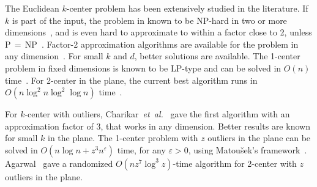 \documentclass[envcountsame]{cls/cccg15}
\renewcommand{\O}{\ensuremath{{O}}}
\newcommand{\eps}{\varepsilon}
\newcommand{\etal}{{\em et~al.\/}}
\begin{document}

The Euclidean $k$-center problem has been extensively studied in the literature.
If $k$ is part of the input,
the problem in known to be NP-hard in two or more dimensions~\cite{fowler1981optimal},
and is even hard to approximate to within a factor close to 2, 
unless P$\,=\,$NP~\cite{feder1988optimal}.
Factor-2 approximation algorithms are available for the problem 
in any dimension~\cite{gonzalez1985clustering,feder1988optimal}.
For small $k$ and $d$, %
better solutions are available.
The 1-center problem in fixed dimensions is known to be LP-type 
and can be solved in $O(n)$ time~\cite{chazelle1996linear}.
For 2-center in the plane, the current best algorithm
runs in $\O(n \log^2 n \log^2 \log n)$ time~\cite{chan1999more}.


For $k$-center with outliers, Charikar~\etal~\cite{charikar2001algorithms} 
gave the first algorithm with an approximation factor of $3$, 
that works in any dimension.
Better results are known for small $k$ in the plane.
The 1-center problem with $z$ outliers in the plane can be solved 
in $\O(n \log n + z^{3} n^{\eps})$ time, for any $\eps > 0$, 
using Matou{\v{s}}ek's framework~\cite{matouvsek1995geometric}.
Agarwal~\cite{agarwal2008efficient} gave a randomized 
$\O(n z^{7} \log^3 z)$-time algorithm for 2-center with $z$ outliers in the plane.
\end{document}
